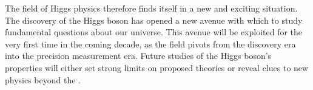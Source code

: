 The field of Higgs physics therefore finds itself in a new and exciting situation. The discovery of the Higgs boson has opened a new avenue with which to study fundamental questions about our universe. This avenue will be exploited for the very first time in the coming decade, as the field pivots from the discovery era into the precision measurement era. Future studies of the Higgs boson's properties will either set strong limits on proposed theories or reveal clues to new physics beyond the \SM. 

